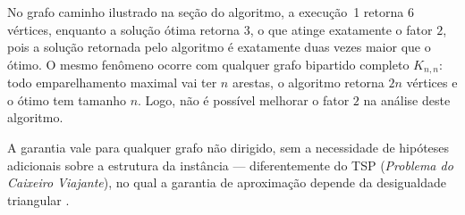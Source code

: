 No grafo caminho ilustrado na seção do algoritmo, a execução~1 retorna $6$ vértices, enquanto a solução ótima retorna $3$, o que atinge exatamente o fator $2$, pois a solução retornada pelo algoritmo é exatamente duas vezes maior que o ótimo. O mesmo fenômeno ocorre com qualquer grafo bipartido completo $K_{n,n}$: todo emparelhamento maximal vai ter $n$ arestas, o algoritmo retorna $2n$ vértices e o ótimo tem tamanho $n$. Logo, não é possível melhorar o fator $2$ na análise deste algoritmo.

A garantia vale para qualquer grafo não dirigido, sem a necessidade de hipóteses adicionais sobre a estrutura da instância — diferentemente do TSP (\textit{Problema do Caixeiro Viajante}), no qual a garantia de aproximação depende da desigualdade triangular \cite[Seção~35.2]{cormen2012}.
